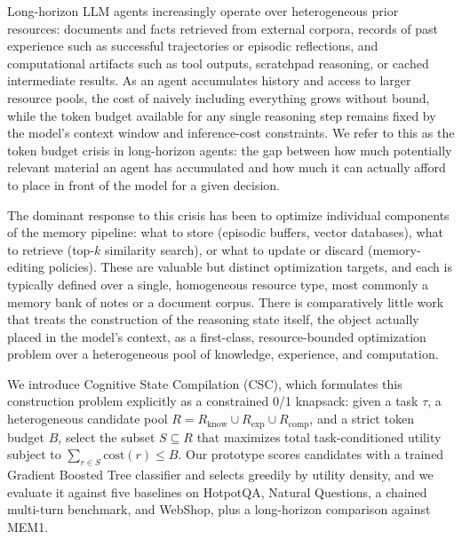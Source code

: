 \documentclass{article}
\begin{document}
Long-horizon LLM agents increasingly operate over heterogeneous prior resources: documents and facts retrieved from external corpora, records of past experience such as successful trajectories or episodic reflections, and computational artifacts such as tool outputs, scratchpad reasoning, or cached intermediate results. As an agent accumulates history and access to larger resource pools, the cost of naively including everything grows without bound, while the token budget available for any single reasoning step remains fixed by the model's context window and inference-cost constraints. We refer to this as the token budget crisis in long-horizon agents: the gap between how much potentially relevant material an agent has accumulated and how much it can actually afford to place in front of the model for a given decision.

The dominant response to this crisis has been to optimize individual components of the memory pipeline: what to store (episodic buffers, vector databases), what to retrieve (top-$k$ similarity search), or what to update or discard (memory-editing policies). These are valuable but distinct optimization targets, and each is typically defined over a single, homogeneous resource type, most commonly a memory bank of notes or a document corpus. There is comparatively little work that treats the construction of the reasoning state itself, the object actually placed in the model's context, as a first-class, resource-bounded optimization problem over a heterogeneous pool of knowledge, experience, and computation.

We introduce Cognitive State Compilation (CSC), which formulates this construction problem explicitly as a constrained 0/1 knapsack: given a task $\tau$, a heterogeneous candidate pool $R = R_{\text{know}} \cup R_{\text{exp}} \cup R_{\text{comp}}$, and a strict token budget $B$, select the subset $S \subseteq R$ that maximizes total task-conditioned utility subject to $\sum_{r \in S} \text{cost}(r) \leq B$. Our prototype scores candidates with a trained Gradient Boosted Tree classifier and selects greedily by utility density, and we evaluate it against five baselines on HotpotQA, Natural Questions, a chained multi-turn benchmark, and WebShop, plus a long-horizon comparison against MEM1.
\end{document}
